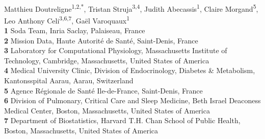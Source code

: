 \documentclass[10pt,letterpaper]{article}
\begin{document}
\vspace*{0.2in}

\begin{flushleft}
  {\Large
    \textbf{} %
  }
  \newline
  \\
  Matthieu Doutreligne\textsuperscript{1,2,*},
  Tristan Struja\textsuperscript{3,4},
  Judith Abecassis\textsuperscript{1},
  Claire Morgand\textsuperscript{5},
  Leo Anthony Celi\textsuperscript{3,6,7},
  Gaël Varoquaux\textsuperscript{1}
  \bigskip
  \\
  \textbf{1} Soda Team, Inria Saclay, Palaiseau, France
  \\
  \textbf{2} Mission Data, Haute Autorité de Santé, Saint-Denis, France
  \\
  \textbf{3} Laboratory for Computational Physiology, Massachusetts Institute of Technology, Cambridge, Massachusetts, United States of America
  \\
  \textbf{4} Medical University Clinic, Division of Endocrinology, Diabetes \& Metabolism, Kantonsspital Aarau, Aarau, Switzerland
  \\
  \textbf{5} Agence Régionale de Santé Ile-de-France, Saint-Denis, France
  \\
  \textbf{6} Division of Pulmonary, Critical Care and Sleep Medicine, Beth Israel Deaconess Medical Center, Boston, Massachusetts, United States of America
  \\
  \textbf{7} Department of Biostatistics, Harvard T.H. Chan School of Public Health, Boston, Massachusetts, United States of America
  \bigskip







\end{flushleft}
\end{document}
